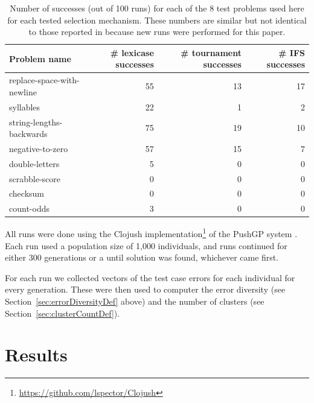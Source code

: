 \begin{table}
	\caption{Number of successes (out of 100 runs) for each of the 8 test problems used here for each
		tested selection mechanism. These numbers are similar but not identical to those reported in 
		\cite{Helmuth:2015:GECCO} because new runs were performed for this paper.}
	\label{tab:successCounts}
	\begin{tabular}{lrrr}
		Problem name \quad & \# lexicase successes \quad & \# tournament successes \quad & \# IFS successes \\
		\hline
		replace-space-with-newline & 55 & 13 & 17 \\
		syllables & 22 & 1 & 2 \\
		string-lengths-backwards & 75 & 19 & 10 \\
		negative-to-zero & 57 & 15 & 7 \\
		double-letters & 5 & 0 & 0 \\
		scrabble-score & 0 & 0 & 0 \\
		checksum & 0 & 0 & 0 \\
		count-odds & 3 & 0 & 0 \\
	\end{tabular}
\end{table}

All runs were done using the Clojush implementation\footnote{\url{https://github.com/lspector/Clojush}} 
of the PushGP system \citep{spector:2002:GPEM, 1068292}. Each run used a population size of 1,000 
individuals, and runs continued for either 300 generations or a until solution was found, whichever 
came first. 

For each run we collected vectors of the test case errors for each individual for every
generation. These were then used to computer the error diversity (see Section~\ref{sec:errorDiversityDef}
above) and the number of clusters (see Section~\ref{sec:clusterCountDef}).

\section{Results}
\label{sec:results}

